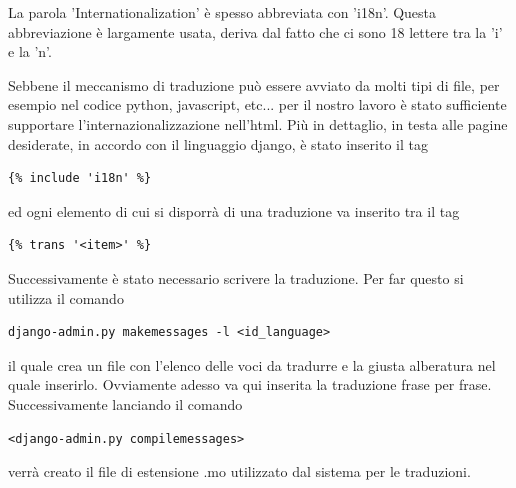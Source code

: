 La parola 'Internationalization' è spesso abbreviata con 'i18n'. Questa abbreviazione è largamente usata, deriva dal fatto che ci sono 18 lettere tra la 'i' e la 'n'.

Sebbene il meccanismo di traduzione può essere avviato da molti tipi di file, per esempio nel codice python, javascript, etc... per il nostro lavoro è stato sufficiente supportare l'internazionalizzazione nell'html. Più in dettaglio, in testa alle pagine desiderate, in accordo con il linguaggio django, è stato inserito  il tag
\begin{lstlisting}
{% include 'i18n' %}
\end{lstlisting}
ed ogni elemento di cui si disporrà di una traduzione va inserito tra il tag \begin{lstlisting}
{% trans '<item>' %}
\end{lstlisting}
Successivamente è stato necessario scrivere la traduzione. Per far questo si utilizza il comando
\begin{lstlisting}
django-admin.py makemessages -l <id_language>
\end{lstlisting}
il quale crea un file con l'elenco delle voci da tradurre e la giusta alberatura  nel quale inserirlo. Ovviamente adesso va qui inserita la traduzione frase per frase. Successivamente lanciando il comando 
\begin{lstlisting}
<django-admin.py compilemessages>
\end{lstlisting}
verrà creato il file di estensione .mo utilizzato dal sistema per le traduzioni.

\endinput
